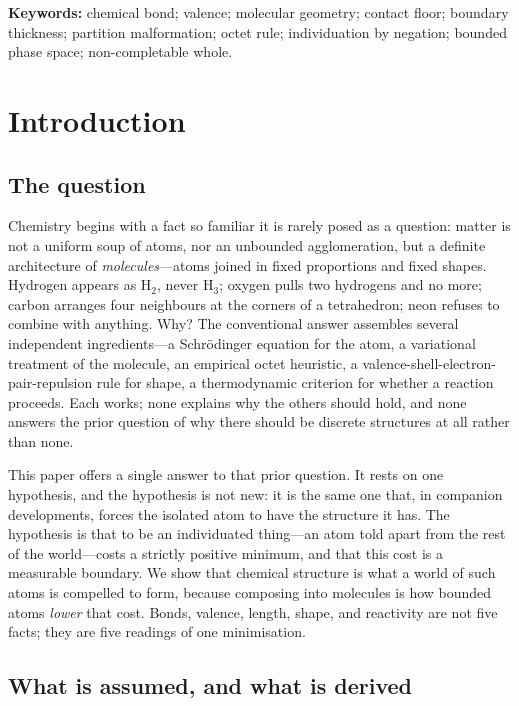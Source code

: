 \documentclass[11pt,a4paper]{article}
\theoremstyle{thmstyle}
\theoremstyle{definition}
\theoremstyle{remark}
\begin{document}
\noindent\textbf{Keywords:} chemical bond; valence; molecular geometry;
contact floor; boundary thickness; partition malformation; octet rule;
individuation by negation; bounded phase space; non-completable whole.

\tableofcontents

\section{Introduction}
\label{sec:intro}

\subsection{The question}

Chemistry begins with a fact so familiar it is rarely posed as a
question: matter is not a uniform soup of atoms, nor an unbounded
agglomeration, but a definite architecture of \emph{molecules}---atoms
joined in fixed proportions and fixed shapes. Hydrogen appears as
H$_2$, never H$_3$; oxygen pulls two hydrogens and no more; carbon
arranges four neighbours at the corners of a tetrahedron; neon refuses
to combine with anything. Why? The conventional answer assembles several
independent ingredients---a Schr\"odinger equation for the atom, a
variational treatment of the molecule, an empirical octet heuristic, a
valence-shell-electron-pair-repulsion rule for shape, a thermodynamic
criterion for whether a reaction proceeds. Each works; none explains why
the others should hold, and none answers the prior question of why there
should be discrete structures at all rather than none.

This paper offers a single answer to that prior question. It rests on
one hypothesis, and the hypothesis is not new: it is the same one that,
in companion developments, forces the isolated atom to have the
structure it has. The hypothesis is that to be an individuated
thing---an atom told apart from the rest of the world---costs a strictly
positive minimum, and that this cost is a measurable boundary. We show
that chemical structure is what a world of such atoms is compelled to
form, because composing into molecules is how bounded atoms
\emph{lower} that cost. Bonds, valence, length, shape, and reactivity
are not five facts; they are five readings of one minimisation.

\subsection{What is assumed, and what is derived}
\end{document}
